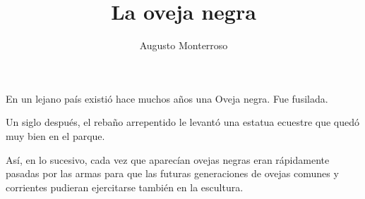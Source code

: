 \documentclass{sffms} %
\author{Augusto Monterroso}
\title{La oveja negra}
\begin{document}
En un lejano pa\'is existi\'o hace muchos a\~nos una Oveja negra. Fue fusilada. 

Un siglo despu\'es, el reba\~no arrepentido le levant\'o una estatua ecuestre que qued\'o muy bien en el parque.

As\'i, en lo sucesivo, cada vez que aparec\'ian ovejas negras eran r\'apidamente pasadas por las armas para que las futuras generaciones de ovejas comunes y corrientes pudieran ejercitarse tambi\'en en la escultura.
\end{document}
